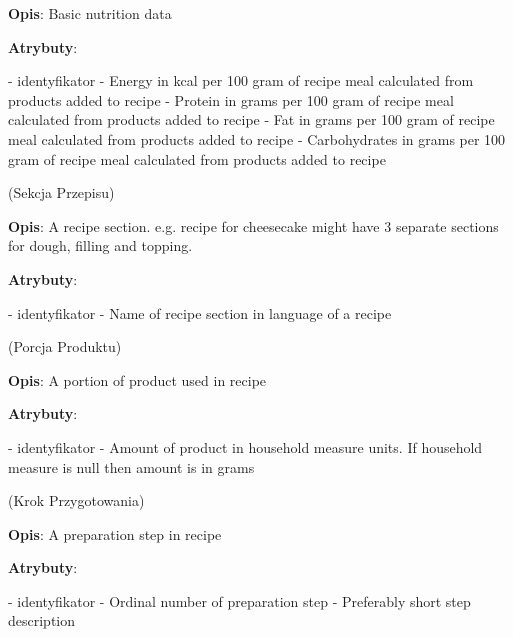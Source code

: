 \begin{enumerate}[label={\textbf{KAT/\protect\threedigits{\theenumi}}}, wide, labelwidth=!, labelindent=0pt, labelsep=0pt, series=reqs]
    \textbf{Opis}: Basic nutrition data
    \par
    \textbf{Atrybuty}:
    \begin{itemize}[series=atr, wide, align=left, leftmargin=190pt]
         \label{kat:RecipeBasicNutritionData:id} - identyfikator
         \label{kat:RecipeBasicNutritionData:energy} - Energy in kcal per 100 gram of recipe meal calculated from products added to recipe
         \label{kat:RecipeBasicNutritionData:protein} - Protein in grams per 100 gram of recipe meal calculated from products added to recipe
         \label{kat:RecipeBasicNutritionData:fat} - Fat in grams per 100 gram of recipe meal calculated from products added to recipe
         \label{kat:RecipeBasicNutritionData:carbohydrates} - Carbohydrates in grams per 100 gram of recipe meal calculated from products added to recipe
    \end{itemize}

     \label{kat:RecipeSection} (Sekcja Przepisu)

    \textbf{Opis}: A recipe section. e.g. recipe for cheesecake might have 3 separate sections for dough, filling and topping.
    \par
    \textbf{Atrybuty}:
    \begin{itemize}[series=atr, wide, align=left, leftmargin=190pt]
         \label{kat:RecipeSection:id} - identyfikator
         \label{kat:RecipeSection:sectionName} - Name of recipe section in language of a recipe
    \end{itemize}

     \label{kat:ProductPortion} (Porcja Produktu)

    \textbf{Opis}: A portion of product used in recipe
    \par
    \textbf{Atrybuty}:
    \begin{itemize}[series=atr, wide, align=left, leftmargin=190pt]
         \label{kat:ProductPortion:id} - identyfikator
         \label{kat:ProductPortion:amount} - Amount of product in household measure units. If household measure is null then amount is in grams
    \end{itemize}

     \label{kat:PreparationStep} (Krok Przygotowania)

    \textbf{Opis}: A preparation step in recipe
    \par
    \textbf{Atrybuty}:
    \begin{itemize}[series=atr, wide, align=left, leftmargin=190pt]
         \label{kat:PreparationStep:id} - identyfikator
         \label{kat:PreparationStep:ordinalNumber} - Ordinal number of preparation step
         \label{kat:PreparationStep:stepDescription} - Preferably short step description
    \end{itemize}


\end{enumerate}
